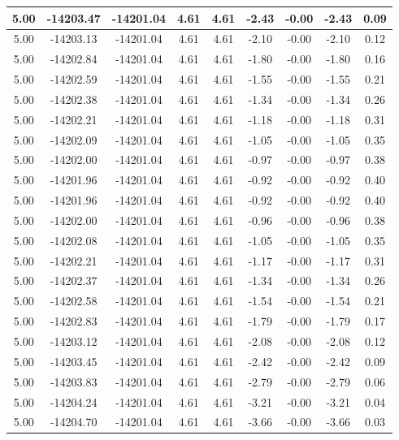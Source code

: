 \begin{table}[htbp]
\begin{adjustbox}{angle=90}
\begin{tabular}{|c|c|c|c|c|c|c|c|c|}
 5.00 & -14203.47 & -14201.04 & 4.61 & 4.61 & -2.43 & -0.00 & -2.43 & 0.09\\ \hline
 5.00 & -14203.13 & -14201.04 & 4.61 & 4.61 & -2.10 & -0.00 & -2.10 & 0.12\\ \hline
 5.00 & -14202.84 & -14201.04 & 4.61 & 4.61 & -1.80 & -0.00 & -1.80 & 0.16\\ \hline
 5.00 & -14202.59 & -14201.04 & 4.61 & 4.61 & -1.55 & -0.00 & -1.55 & 0.21\\ \hline
 5.00 & -14202.38 & -14201.04 & 4.61 & 4.61 & -1.34 & -0.00 & -1.34 & 0.26\\ \hline
 5.00 & -14202.21 & -14201.04 & 4.61 & 4.61 & -1.18 & -0.00 & -1.18 & 0.31\\ \hline
 5.00 & -14202.09 & -14201.04 & 4.61 & 4.61 & -1.05 & -0.00 & -1.05 & 0.35\\ \hline
 5.00 & -14202.00 & -14201.04 & 4.61 & 4.61 & -0.97 & -0.00 & -0.97 & 0.38\\ \hline
 5.00 & -14201.96 & -14201.04 & 4.61 & 4.61 & -0.92 & -0.00 & -0.92 & 0.40\\ \hline
 5.00 & -14201.96 & -14201.04 & 4.61 & 4.61 & -0.92 & -0.00 & -0.92 & 0.40\\ \hline
 5.00 & -14202.00 & -14201.04 & 4.61 & 4.61 & -0.96 & -0.00 & -0.96 & 0.38\\ \hline
 5.00 & -14202.08 & -14201.04 & 4.61 & 4.61 & -1.05 & -0.00 & -1.05 & 0.35\\ \hline
 5.00 & -14202.21 & -14201.04 & 4.61 & 4.61 & -1.17 & -0.00 & -1.17 & 0.31\\ \hline
 5.00 & -14202.37 & -14201.04 & 4.61 & 4.61 & -1.34 & -0.00 & -1.34 & 0.26\\ \hline
 5.00 & -14202.58 & -14201.04 & 4.61 & 4.61 & -1.54 & -0.00 & -1.54 & 0.21\\ \hline
 5.00 & -14202.83 & -14201.04 & 4.61 & 4.61 & -1.79 & -0.00 & -1.79 & 0.17\\ \hline
 5.00 & -14203.12 & -14201.04 & 4.61 & 4.61 & -2.08 & -0.00 & -2.08 & 0.12\\ \hline
 5.00 & -14203.45 & -14201.04 & 4.61 & 4.61 & -2.42 & -0.00 & -2.42 & 0.09\\ \hline
 5.00 & -14203.83 & -14201.04 & 4.61 & 4.61 & -2.79 & -0.00 & -2.79 & 0.06\\ \hline
 5.00 & -14204.24 & -14201.04 & 4.61 & 4.61 & -3.21 & -0.00 & -3.21 & 0.04\\ \hline
 5.00 & -14204.70 & -14201.04 & 4.61 & 4.61 & -3.66 & -0.00 & -3.66 & 0.03\\ \hline

\end{tabular}
\end{adjustbox}
\end{table}

